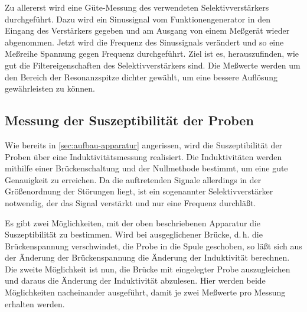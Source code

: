 Zu allererst wird eine Güte-Messung des verwendeten Selektivverstärkers
durchgeführt.  Dazu wird ein Sinussignal vom Funktionengenerator in den
Eingang des Verstärkers gegeben und am Ausgang von einem Meßgerät wieder
abgenommen.  Jetzt wird die Frequenz des Sinussignals verändert und so
eine Meßreihe Spannung gegen Frequenz durchgeführt.  Ziel ist es,
herauszufinden, wie gut die Filtereigenschaften des Selektivverstärkers
sind.  Die Meßwerte werden um den Bereich der Resonanzspitze dichter
gewählt, um eine bessere Auflösung gewährleisten zu können.

\subsection{Messung der Suszeptibilität der Proben}

Wie bereits in \cref{sec:aufbau-apparatur} angerissen, wird die
Suszeptibilität der Proben über eine Induktivitätsmessung realisiert.
Die Induktivitäten werden mithilfe einer Brückenschaltung und der
Nullmethode bestimmt, um eine gute Genauigkeit zu erreichen.  Da die
auftretenden Signale allerdings in der Größenordnung der Störungen
liegt, ist ein sogenannter Selektivverstärker notwendig, der das Signal
verstärkt und nur eine Frequenz durchläßt.

Es gibt zwei Möglichkeiten, mit der oben beschriebenen Apparatur die
Suszeptibilität zu bestimmen.  Wird bei ausgeglichener Brücke,
d.\,h. die Brückenspannung verschwindet, die Probe in die Spule
geschoben, so läßt sich aus der Änderung der Brückenspannung die
Änderung der Induktivität berechnen.  Die zweite Möglichkeit ist nun,
die Brücke mit eingelegter Probe auszugleichen und daraus die Änderung
der Induktivität abzulesen.  Hier werden beide Möglichkeiten
nacheinander ausgeführt, damit je zwei Meßwerte pro Messung erhalten
werden.
